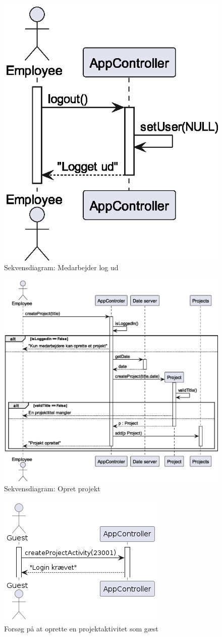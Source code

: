 \begin{figure}[H]
    \centering
    \caption{Sekvensdiagram: Medarbejder log ud}\label{fig:sequence_logout}
    \includegraphics[width = .3\textwidth]{Diagrams/Logout.eps}
\end{figure}
\begin{figure}[H]
    \centering
    \caption{Sekvensdiagram: Opret projekt}\label{fig:sequence_create_project}
    \includegraphics[width = .75\textwidth]{Diagrams/CreateProject.eps}
\end{figure}
\begin{figure}[H]
    \centering
    \caption{Forsøg på at oprette en projektaktivitet som gæst}\label{fig:sequence_create_PA_guest}
    \includegraphics[width = .35\textwidth]{Diagrams/createActivityNoPLGuest.png}
\end{figure}
